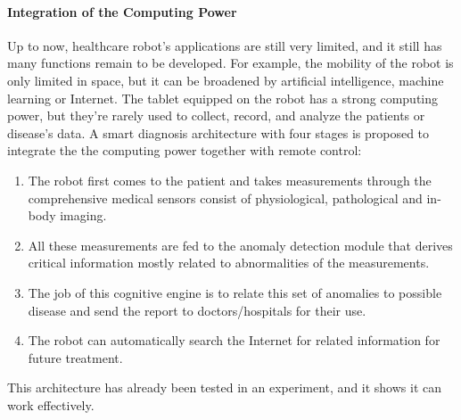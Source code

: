 \documentclass[a4paper]{article}
\begin{document}
\paragraph{Integration of the Computing Power}
    Up to now, healthcare robot's applications are still very limited, and it still has many functions remain to be developed. For example, the mobility of the robot is only limited in space, but it can be broadened by artificial intelligence, machine learning or Internet. The tablet equipped on the robot has a strong computing power, but they're rarely used to collect, record, and analyze the patients or disease's data. A smart diagnosis architecture with four stages is proposed to integrate the the computing power together with remote control\cite{31}:
\begin{enumerate}
    \item The robot first comes to the patient and takes measurements through the comprehensive medical sensors consist of physiological, pathological and in-body imaging.
    \item All these measurements are fed to the anomaly detection module that derives critical information mostly related to abnormalities of the measurements. 
    \item The job of this cognitive engine is to relate this set of anomalies to possible disease and send the report to doctors/hospitals for their use.
    \item The robot can automatically search the Internet for related information for future treatment.
\end{enumerate}
    This architecture has already been tested in an experiment, and it shows it can work effectively.
\end{document}
